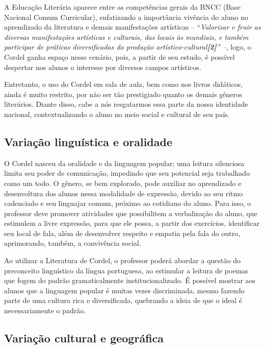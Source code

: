 \documentclass[12pt]{extarticle}
\begin{document}
A Educação Literária aparece entre as competências gerais da BNCC (Base
Nacional Comum Curricular), enfatizando a importância vivência do aluno
no aprendizado da literatura e demais manifestações artísticas --
``\emph{Valorizar e fruir as diversas manifestações artísticas e
culturais, das locais às mundiais, e também participar de práticas
diversificadas da produção artístico-cultural\textbf{{[}2{]}}'' --},
logo, o Cordel ganha espaço nesse cenário, pois, a partir de seu estudo,
é possível despertar nos alunos o interesse por diversos campos
artísticos.

Entretanto, o uso do Cordel em sala de aula, bem como nos livros
didáticos, ainda é muito restrito, por não ser tão prestigiado quanto os
demais gêneros literários. Diante disso, cabe a nós resgatarmos essa
parte da nossa identidade nacional, contextualizando o aluno no meio
social e cultural de seu país.


\subsection{Variação linguística e oralidade}

O Cordel nasceu da oralidade e da linguagem popular; uma leitura
silenciosa limita seu poder de comunicação, impedindo que seu potencial
seja trabalhado como um todo. O gênero, se bem explorado, pode auxiliar
no aprendizado e desenvoltura dos alunos nessa modalidade de expressão,
devido ao seu ritmo cadenciado e seu linguajar comum, próximo ao
cotidiano do aluno. Para isso, o professor deve promover atividades que
possibilitem a verbalização do aluno, que estimulem a livre expressão,
para que ele possa, a partir dos exercícios, identificar seu local de
fala, além de desenvolver respeito e empatia pela fala do outro,
aprimorando, também, a convivência social.

Ao utilizar a Literatura de Cordel, o professor poderá abordar a questão
do preconceito linguístico da língua portuguesa, ao estimular a leitura
de poemas que fogem do padrão gramaticalmente institucionalizado. É
possível mostrar aos alunos que a linguagem popular é muitas vezes
discriminada, mesmo fazendo parte de uma cultura rica e diversificada,
quebrando a ideia de que o ideal é necessariamente o padrão.

\subsection{Variação cultural e geográfica}
\end{document}

